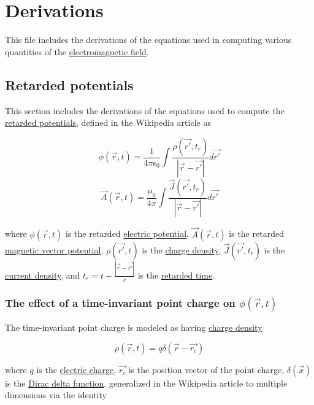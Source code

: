 ﻿\documentclass{article}
\begin{document}
\section{Derivations}

This file includes the derivations of the equations used in computing various quantities of the \href{https://en.wikipedia.org/wiki/Electromagnetic_field}{electromagnetic field}.

\subsection{Retarded potentials}

This section includes the derivations of the equations used to compute the \href{https://en.wikipedia.org/wiki/Retarded_potential}{retarded potentials}, defined in the Wikipedia article as

$$\phi(\vec{r}, t) = \frac{1}{4 \pi \epsilon_0} \int \frac{\rho(\vec{r'}, t_r)}{|\vec{r} - \vec{r'}|} d \vec{r'}$$
$$\vec{A}(\vec{r}, t) = \frac{\mu_0}{4 \pi} \int \frac{\vec{J}(\vec{r'}, t_r)}{|\vec{r} - \vec{r'}|} d \vec{r'}$$

where $\phi(\vec{r}, t)$ is the retarded \href{https://en.wikipedia.org/wiki/Electric_potential}{electric potential}, $\vec{A}(\vec{r}, t)$ is the retarded \href{https://en.wikipedia.org/wiki/Magnetic_vector_potential}{magnetic vector potential}, $\rho(\vec{r'}, t)$ is the \href{https://en.wikipedia.org/wiki/Charge_density}{charge density}, $\vec{J}(\vec{r'}, t_r)$ is the \href{https://en.wikipedia.org/wiki/Current_density}{current density}, and $t_r = t - \frac{|\vec{r} - \vec{r'}|}{c}$ is the \href{https://en.wikipedia.org/wiki/Retarded_time}{retarded time}.

\subsubsection{The effect of a time-invariant point charge on $\phi(\vec{r}, t)$}

The time-invariant point charge is modeled as having \href{https://en.wikipedia.org/wiki/Charge_density}{charge density}

$$\rho(\vec{r}, t) = q \delta(\vec{r} - \vec{r_c})$$

where $q$ is the \href{https://en.wikipedia.org/wiki/Electric_charge}{electric charge}, $\vec{r_c}$ is the position vector of the point charge, $\delta(\vec{x})$ is the \href{https://en.wikipedia.org/wiki/Dirac_delta_function}{Dirac delta function}, generalized in the Wikipedia article to 
multiple dimensions via the identity
\end{document}
